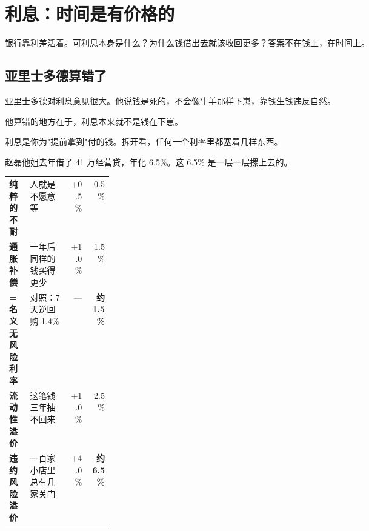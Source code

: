 \chapter{利息：时间是有价格的}

\begin{ledetext}
银行靠利差活着。可利息本身是什么？为什么钱借出去就该收回更多？答案不在钱上，在时间上。
\end{ledetext}

\section{亚里士多德算错了}

亚里士多德对利息意见很大。他说钱是死的，不会像牛羊那样下崽，靠钱生钱违反自然。

他算错的地方在于，利息本来就不是钱在下崽。

利息是你为"提前拿到"付的钱。拆开看，任何一个利率里都塞着几样东西。

\begin{flowlist}
\end{flowlist}

赵磊他姐去年借了 41 万经营贷，年化 6.5\%。这 6.5\% 是一层一层摞上去的。

\begin{tablewrap}
\begin{xltabular}{\linewidth}{>{\raggedright\arraybackslash}p{0.20\linewidth}Xrr}
\toprule
{} &  &  &  \\
\midrule
\textbf{纯粹的不耐} & 人就是不愿意等 & +0.5\% & 0.5\% \\
\textbf{通胀补偿} & 一年后同样的钱买得更少 & +1.0\% & 1.5\% \\
\textbf{\textbf{= 名义无风险利率}} & 对照：7 天逆回购 1.4\% & — & \textbf{约 1.5\%} \\
\textbf{流动性溢价} & 这笔钱三年抽不回来 & +1.0\% & 2.5\% \\
\textbf{违约风险溢价} & 一百家小店里总有几家关门 & +4.0\% & \textbf{约 6.5\%} \\
\bottomrule
\end{xltabular}
\end{tablewrap}

